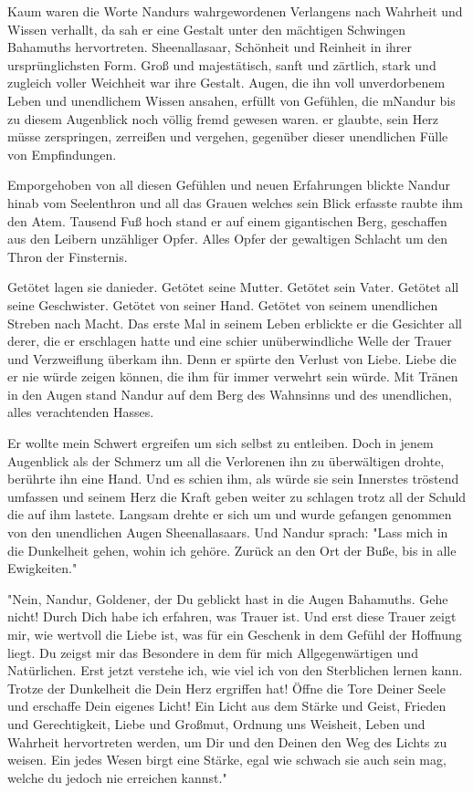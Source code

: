 \documentclass[10pt,twoside,BCOR=12mm,DIV=classic]{scrbook}
\begin{document}
Kaum waren die Worte Nandurs wahrgewordenen Verlangens nach Wahrheit und Wissen
verhallt, da sah er eine Gestalt unter den mächtigen Schwingen Bahamuths
hervortreten. Sheenallasaar, Schönheit und Reinheit in ihrer ursprünglichsten
Form. Groß und majestätisch, sanft und zärtlich, stark und zugleich voller
Weichheit war ihre Gestalt. Augen, die ihn voll unverdorbenem Leben und
unendlichem Wissen ansahen, erfüllt von Gefühlen, die mNandur bis zu diesem
Augenblick noch völlig fremd gewesen waren. er glaubte, sein Herz müsse
zerspringen, zerreißen und vergehen, gegenüber dieser unendlichen Fülle von
Empfindungen.

Emporgehoben von all diesen Gefühlen und neuen Erfahrungen blickte Nandur hinab
vom Seelenthron und all das Grauen welches sein Blick erfasste raubte ihm den
Atem. Tausend Fuß hoch stand er auf einem gigantischen Berg, geschaffen aus den
Leibern unzähliger Opfer. Alles Opfer der gewaltigen Schlacht um den Thron der
Finsternis.

Getötet lagen sie danieder. Getötet seine Mutter. Getötet sein Vater. Getötet
all seine Geschwister. Getötet von seiner Hand. Getötet von seinem unendlichen
Streben nach Macht.
Das erste Mal in seinem Leben erblickte er die Gesichter all derer, die er
erschlagen hatte und eine schier unüberwindliche Welle der Trauer und
Verzweiflung überkam ihn. Denn er spürte den Verlust von Liebe. Liebe die er nie
würde zeigen können, die ihm für immer verwehrt sein würde.
Mit Tränen in den Augen stand Nandur auf dem Berg des Wahnsinns und des
unendlichen, alles verachtenden Hasses.

Er wollte mein Schwert ergreifen um sich selbst zu entleiben. Doch in jenem
Augenblick als der Schmerz um all die Verlorenen ihn zu überwältigen drohte,
berührte ihn eine Hand. Und es schien ihm, als würde sie sein Innerstes tröstend
umfassen und seinem Herz die Kraft geben weiter zu schlagen trotz all der Schuld
die auf ihm lastete. Langsam drehte er sich um und wurde gefangen genommen von
den unendlichen Augen Sheenallasaars. Und Nandur sprach: "Lass mich in die
Dunkelheit gehen, wohin ich gehöre. Zurück an den Ort der Buße, bis in alle
Ewigkeiten."

"Nein, Nandur, Goldener, der Du geblickt hast in die Augen Bahamuths. Gehe
nicht! Durch Dich habe ich erfahren, was Trauer ist. Und erst diese Trauer zeigt
mir, wie wertvoll die Liebe ist, was für ein Geschenk in dem Gefühl der Hoffnung
liegt. Du zeigst mir das Besondere in dem für mich Allgegenwärtigen und
Natürlichen. Erst jetzt verstehe ich, wie viel ich von den Sterblichen lernen
kann. Trotze der Dunkelheit die Dein Herz ergriffen hat! Öffne die Tore Deiner
Seele und erschaffe Dein eigenes Licht! Ein Licht aus dem Stärke und Geist,
Frieden und Gerechtigkeit, Liebe und Großmut, Ordnung uns Weisheit, Leben und
Wahrheit hervortreten werden, um Dir und den Deinen den Weg des Lichts zu
weisen. Ein jedes Wesen birgt eine Stärke, egal wie schwach sie auch sein mag,
welche du jedoch nie erreichen kannst."
\end{document}
